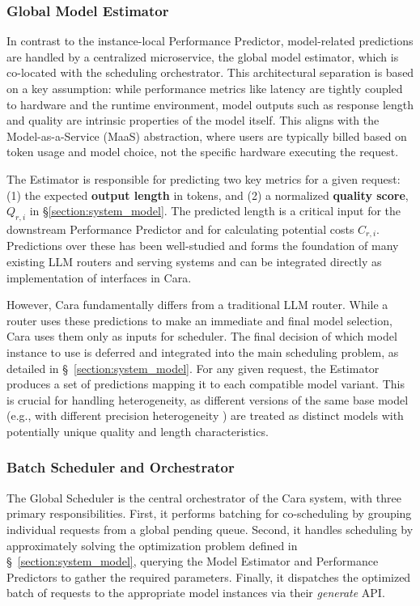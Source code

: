 \documentclass[letterpaper, anonymous, twocolumn, 10pt]{article}
\begin{document}
\subsubsection{Global Model Estimator}

In contrast to the instance-local Performance Predictor, model-related predictions are handled by a centralized microservice, the global model estimator, which is co-located with the scheduling orchestrator. This architectural separation is based on a key assumption: while performance metrics like latency are tightly coupled to hardware and the runtime environment, model outputs such as response length and quality are intrinsic properties of the model itself. This aligns with the Model-as-a-Service (MaaS) abstraction, where users are typically billed based on token usage and model choice, not the specific hardware executing the request.

The Estimator is responsible for predicting two key metrics for a given request: (1) the expected \textbf{output length} in tokens, and (2) a normalized \textbf{quality score}, $Q_{r,i}$ in \S \ref{section:system_model}. The predicted length is a critical input for the downstream Performance Predictor and for calculating potential costs $C_{r,i}$. Predictions over these has been well-studied and forms the foundation of many existing LLM routers \cite{lakha2025faster, chen2023frugalgpthowuse, Ong2024RouteLLMLT, mei2025eccosefficientcapability, universal_model_routering, wu2025qualityofserviceawarellm, ye2025beyondgpt5making} and serving systems \cite{arango2025prefix, qlm, Gong_2025, xue2023responselengthperception, hu2024inferenceinterferencedisaggregatellm} and can be integrated directly as implementation of interfaces in Cara.

However, Cara fundamentally differs from a traditional LLM router. While a router uses these predictions to make an immediate and final model selection, Cara uses them only as inputs for scheduler. The final decision of which model instance to use is deferred and integrated into the main scheduling problem, as detailed in \S~\ref{section:system_model}. For any given request, the Estimator produces a set of predictions mapping it to each compatible model variant. This is crucial for handling heterogeneity, as different versions of the same base model (e.g., with different precision heterogeneity \cite{bin2025fineserveprecisionawarekvslab}) are treated as distinct models with potentially unique quality and length characteristics.

\subsubsection{Batch Scheduler and Orchestrator}
The Global Scheduler is the central orchestrator of the Cara system, with three primary responsibilities. First, it performs batching for co-scheduling by grouping individual requests from a global pending queue. Second, it handles scheduling by approximately solving the optimization problem defined in \S~\ref{section:system_model}, querying the Model Estimator and Performance Predictors to gather the required parameters. Finally, it dispatches the optimized batch of requests to the appropriate model instances via their \textit{generate} API.
\end{document}

